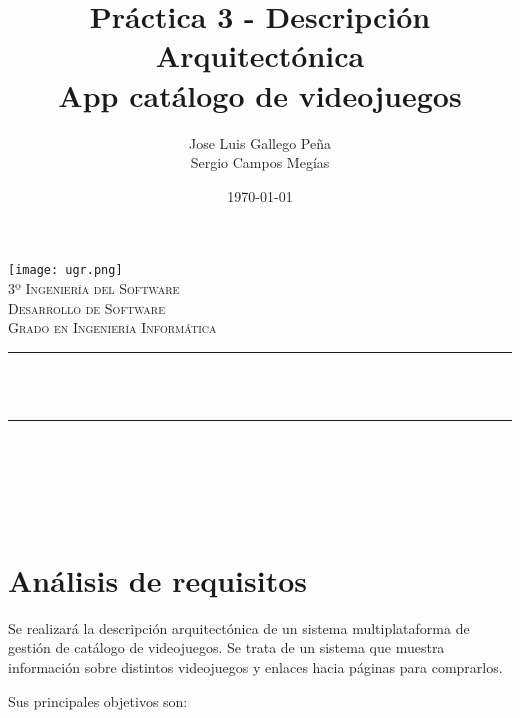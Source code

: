 \documentclass[11pt, spanish]{article}
\title{Práctica 3 - Descripción Arquitectónica\\App catálogo de videojuegos\hspace{0.05cm}}
\author{Jose Luis Gallego Peña\\Sergio Campos Megías}
\date{\today}
\makeatletter
\let\thetitle\@title
\let\theauthor\@author
\let\thedate\@date
\makeatother
\begin{document}

\begin{titlepage}
    \centering
    \vspace*{0.1 cm}
    \texttt{[image: ugr.png]}\\[0.5 cm]
    \textsc{\large 3º Ingeniería del Software}\\[0.5 cm]        
    \textsc{\large Desarrollo de Software}\\[0.5 cm]       
    \textsc{\large Grado en Ingeniería Informática}\\[0.5 cm]              
    \rule{\linewidth}{0.2 mm} \\[0.2 cm]
    { \huge \bfseries \thetitle}\\
    \rule{\linewidth}{0.2 mm} \\[1.5 cm]
    	
    \begin{minipage}{1\textwidth}
        \begin{center} \large
            \theauthor
        \end{center}
    \end{minipage}~
    
    \vspace{2cm}
    {\large \thedate}\\[1 cm]
 	
    \vfill
    
\end{titlepage}


\tableofcontents
\pagebreak

\section{Análisis de requisitos}

Se realizará la descripción arquitectónica de un sistema multiplataforma de gestión de catálogo de videojuegos. Se trata de un sistema que muestra información sobre distintos videojuegos y enlaces hacia páginas para comprarlos.

Sus principales objetivos son:
\end{document}
